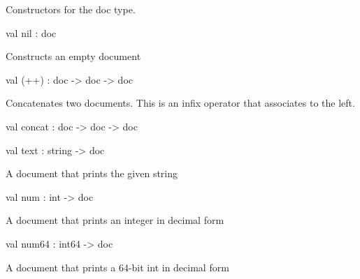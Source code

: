 \documentclass[11pt]{article}
\begin{document}
Constructors for the doc type.



\label{val:Pretty.nil}\begin{ocamldoccode}
val nil : doc
\end{ocamldoccode}
\begin{ocamldocdescription}
Constructs an empty document


\end{ocamldocdescription}




\label{val:Pretty.(-plus-plus)}\begin{ocamldoccode}
val (++) : doc -> doc -> doc
\end{ocamldoccode}
\begin{ocamldocdescription}
Concatenates two documents. This is an infix operator that associates to 
    the left.


\end{ocamldocdescription}




\label{val:Pretty.concat}\begin{ocamldoccode}
val concat : doc -> doc -> doc
\end{ocamldoccode}




\label{val:Pretty.text}\begin{ocamldoccode}
val text : string -> doc
\end{ocamldoccode}
\begin{ocamldocdescription}
A document that prints the given string


\end{ocamldocdescription}




\label{val:Pretty.num}\begin{ocamldoccode}
val num : int -> doc
\end{ocamldoccode}
\begin{ocamldocdescription}
A document that prints an integer in decimal form


\end{ocamldocdescription}




\label{val:Pretty.num64}\begin{ocamldoccode}
val num64 : int64 -> doc
\end{ocamldoccode}
\begin{ocamldocdescription}
A document that prints a 64-bit int in decimal form


\end{ocamldocdescription}
\end{document}
